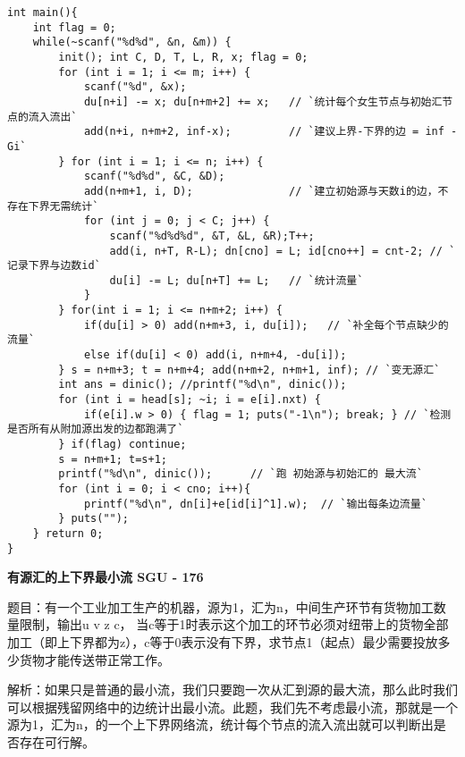 \begin{lstlisting}
int main(){
    int flag = 0;
    while(~scanf("%d%d", &n, &m)) {
        init(); int C, D, T, L, R, x; flag = 0;
        for (int i = 1; i <= m; i++) {
            scanf("%d", &x);
            du[n+i] -= x; du[n+m+2] += x;   // `统计每个女生节点与初始汇节点的流入流出`
            add(n+i, n+m+2, inf-x);         // `建议上界-下界的边 = inf - Gi`
        } for (int i = 1; i <= n; i++) {
            scanf("%d%d", &C, &D);
            add(n+m+1, i, D);               // `建立初始源与天数i的边，不存在下界无需统计`
            for (int j = 0; j < C; j++) {
                scanf("%d%d%d", &T, &L, &R);T++;
                add(i, n+T, R-L); dn[cno] = L; id[cno++] = cnt-2; // `记录下界与边数id`
                du[i] -= L; du[n+T] += L;   // `统计流量`
            }
        } for(int i = 1; i <= n+m+2; i++) {
            if(du[i] > 0) add(n+m+3, i, du[i]);   // `补全每个节点缺少的流量`
            else if(du[i] < 0) add(i, n+m+4, -du[i]);
        } s = n+m+3; t = n+m+4; add(n+m+2, n+m+1, inf); // `变无源汇`
        int ans = dinic(); //printf("%d\n", dinic()); 
        for (int i = head[s]; ~i; i = e[i].nxt) {
            if(e[i].w > 0) { flag = 1; puts("-1\n"); break; } // `检测是否所有从附加源出发的边都跑满了`
        } if(flag) continue;
        s = n+m+1; t=s+1;
        printf("%d\n", dinic());      // `跑 初始源与初始汇的 最大流`
        for (int i = 0; i < cno; i++){
            printf("%d\n", dn[i]+e[id[i]^1].w);  // `输出每条边流量`
        } puts("");
    } return 0;
}
\end{lstlisting}


{\bfseries 有源汇的上下界最小流 SGU - 176 }

题目：有一个工业加工生产的机器，源为1，汇为n，中间生产环节有货物加工数量限制，输出u v z c， 当c等于1时表示这个加工的环节必须对纽带上的货物全部加工（即上下界都为z），c等于0表示没有下界，求节点1（起点）最少需要投放多少货物才能传送带正常工作。 

解析：如果只是普通的最小流，我们只要跑一次从汇到源的最大流，那么此时我们可以根据残留网络中的边统计出最小流。此题，我们先不考虑最小流，那就是一个源为1，汇为n，的一个上下界网络流，统计每个节点的流入流出就可以判断出是否存在可行解。

